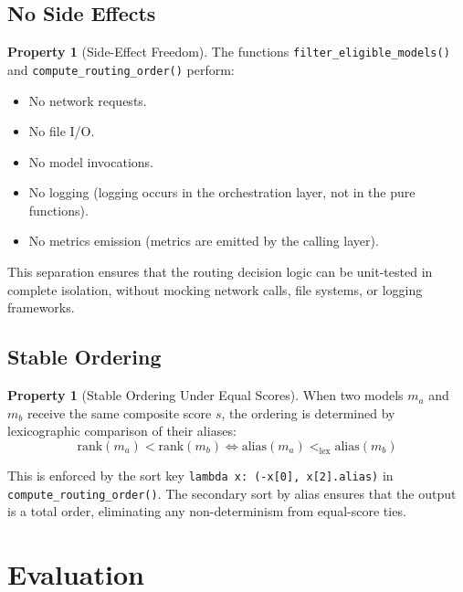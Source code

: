 \documentclass[11pt,a4paper]{article}
\theoremstyle{plain}
\theoremstyle{definition}
\newtheorem{property}[theorem]{Property}
\begin{document}
\subsection{No Side Effects}

\begin{property}[Side-Effect Freedom]
The functions \texttt{filter\_eligible\_models()} and
\texttt{compute\_routing\_order()} perform:
\begin{itemize}
\item No network requests.
\item No file I/O.
\item No model invocations.
\item No logging (logging occurs in the orchestration layer, not in the
  pure functions).
\item No metrics emission (metrics are emitted by the calling layer).
\end{itemize}
\end{property}

This separation ensures that the routing decision logic can be unit-tested in
complete isolation, without mocking network calls, file systems, or logging
frameworks.

\subsection{Stable Ordering}

\begin{property}[Stable Ordering Under Equal Scores]
When two models $m_a$ and $m_b$ receive the same composite score $s$, the
ordering is determined by lexicographic comparison of their aliases:
\[
  \text{rank}(m_a) < \text{rank}(m_b) \iff \text{alias}(m_a) <_{\text{lex}}
  \text{alias}(m_b)
\]
\end{property}

This is enforced by the sort key
\texttt{lambda x: (-x[0], x[2].alias)} in \texttt{compute\_routing\_order()}.
The secondary sort by alias ensures that the output is a total order, eliminating
any non-determinism from equal-score ties.

\section{Evaluation}
\label{sec:evaluation}
\end{document}
